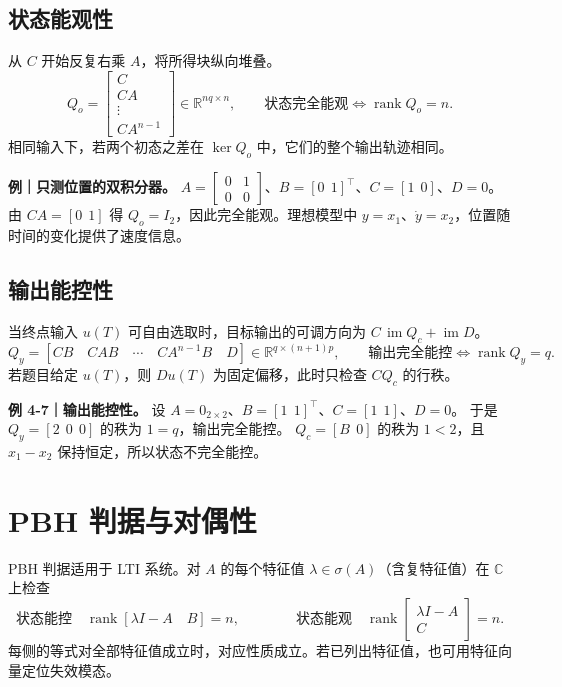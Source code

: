 \documentclass[UTF8,a4paper,12pt,fontset=fandol]{ctexart}
\DeclareMathOperator{\rank}{rank}
\DeclareMathOperator{\im}{im}
\begin{document}
\subsection*{状态能观性}
从 $C$ 开始反复右乘 $A$，将所得块纵向堆叠。
\[
  Q_o=\begin{bmatrix} C\\CA\\\vdots\\CA^{n-1}\end{bmatrix}
     \in\mathbb R^{nq\times n},
  \qquad \boxed{\text{状态完全能观}\iff \rank Q_o=n.}
\]
相同输入下，若两个初态之差在 $\ker Q_o$ 中，它们的整个输出轨迹相同。

\textbf{例｜只测位置的双积分器。}
$A=\left[\begin{smallmatrix}0&1\\0&0\end{smallmatrix}\right]$、$B=[0\ \ 1]^\top$、$C=[1\ \ 0]$、$D=0$。
由 $CA=[0\ \ 1]$ 得 $Q_o=I_2$，因此完全能观。理想模型中 $y=x_1$、$\dot y=x_2$，位置随时间的变化提供了速度信息。

\subsection*{输出能控性}
当终点输入 $u(T)$ 可自由选取时，目标输出的可调方向为 $C\,\im Q_c+\im D$。
\[
  Q_y=[CB\quad CAB\quad\cdots\quad CA^{n-1}B\quad D]
      \in\mathbb R^{q\times (n+1)p},
  \qquad \boxed{\text{输出完全能控}\iff \rank Q_y=q.}
\]
若题目给定 $u(T)$，则 $Du(T)$ 为固定偏移，此时只检查 $CQ_c$ 的行秩。

\textbf{例 4-7｜输出能控性。}
设 $A=0_{2\times2}$、$B=[1\ \ 1]^\top$、$C=[1\ \ 1]$、$D=0$。
于是 $Q_y=[2\ \ 0\ \ 0]$ 的秩为 $1=q$，输出完全能控。
$Q_c=[B\ \ 0]$ 的秩为 $1<2$，且 $x_1-x_2$ 保持恒定，所以状态不完全能控。

\newpage
\section{PBH 判据与对偶性}\label{sec:pbh}

PBH 判据适用于 LTI 系统。对 $A$ 的每个特征值 $\lambda\in\sigma(A)$（含复特征值）在 $\mathbb C$ 上检查
\[
  \text{状态能控}\quad \rank[\lambda I-A\quad B]=n,
  \qquad\qquad
  \text{状态能观}\quad \rank\begin{bmatrix}\lambda I-A\\ C\end{bmatrix}=n.
\]
每侧的等式对全部特征值成立时，对应性质成立。若已列出特征值，也可用特征向量定位失效模态。
\end{document}
